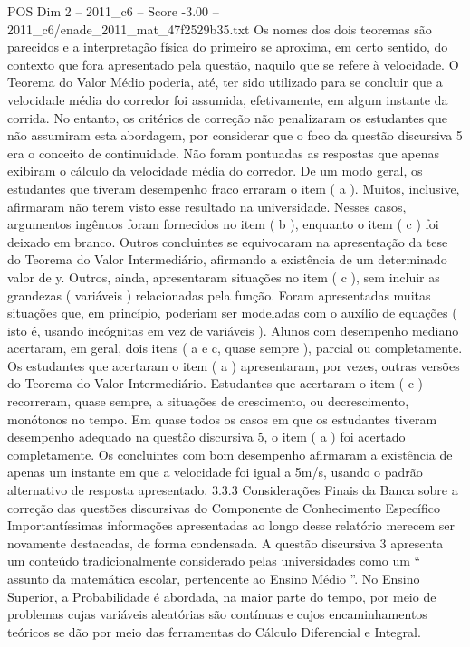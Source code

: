 \begin{textsample}{POS Dim 2 – 2011\_c6 – Score -3.00 – 2011\_c6/enade\_2011\_mat\_47f2529b35.txt}
Os nomes dos dois teoremas são parecidos e a interpretação física do primeiro se aproxima, em certo sentido, do contexto que fora apresentado pela questão, naquilo que se refere à velocidade.
O Teorema do Valor Médio poderia, até, ter sido utilizado para se concluir que a velocidade média do corredor foi assumida, efetivamente, em algum instante da corrida.
No entanto, os critérios de correção não penalizaram os estudantes que não assumiram esta abordagem, por considerar que o foco da questão discursiva 5 era o conceito de continuidade.
Não foram pontuadas as respostas que apenas exibiram o cálculo da velocidade média do corredor.
De um modo geral, os estudantes que tiveram desempenho fraco erraram o item ( a ).
Muitos, inclusive, afirmaram não terem visto esse resultado na universidade.
Nesses casos, argumentos ingênuos foram fornecidos no item ( b ), enquanto o item ( c ) foi deixado em branco.
Outros concluintes se equivocaram na apresentação da tese do Teorema do Valor Intermediário, afirmando a existência de um determinado valor de y.
Outros, ainda, apresentaram situações no item ( c ), sem incluir as grandezas ( variáveis ) relacionadas pela função.
Foram apresentadas muitas situações que, em princípio, poderiam ser modeladas com o auxílio de equações ( isto é, usando incógnitas em vez de variáveis ).
Alunos com desempenho mediano acertaram, em geral, dois itens ( a e c, quase sempre ), parcial ou completamente.
Os estudantes que acertaram o item ( a ) apresentaram, por vezes, outras versões do Teorema do Valor Intermediário.
Estudantes que acertaram o item ( c ) recorreram, quase sempre, a situações de crescimento, ou decrescimento, monótonos no tempo.
Em quase todos os casos em que os estudantes tiveram desempenho adequado na questão discursiva 5, o item ( a ) foi acertado completamente.
Os concluintes com bom desempenho afirmaram a existência de apenas um instante em que a velocidade foi igual a 5m/s, usando o padrão alternativo de resposta apresentado. 3.3.3 Considerações Finais da Banca sobre a correção das questões discursivas do Componente de Conhecimento Específico Importantíssimas informações apresentadas ao longo desse relatório merecem ser novamente destacadas, de forma condensada.
A questão discursiva 3 apresenta um conteúdo tradicionalmente considerado pelas universidades como um “ assunto da matemática escolar, pertencente ao Ensino Médio ”.
No Ensino Superior, a Probabilidade é abordada, na maior parte do tempo, por meio de problemas cujas variáveis aleatórias são contínuas e cujos encaminhamentos teóricos se dão por meio das ferramentas do Cálculo Diferencial e Integral.

\end{textsample}
